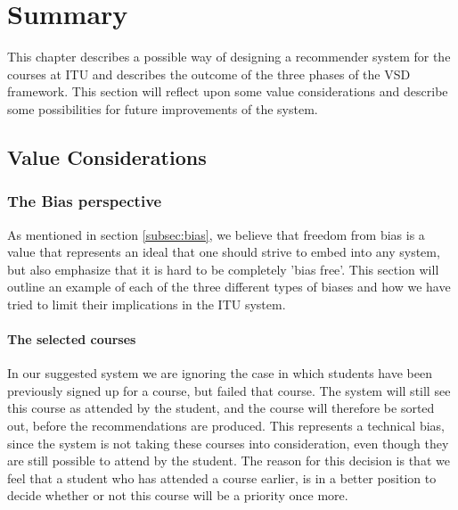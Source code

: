 
\section{Summary}
This chapter describes a possible way of designing a recommender system for the courses at ITU and describes the outcome of the three phases of the VSD framework.\newline
This section will reflect upon some value considerations and describe some possibilities for future improvements of the system. 

\subsection{Value Considerations} %
\label{sub:value_considerations}
\subsubsection{The Bias perspective}
\label{subsubsec:biasperspective}
As mentioned in section \ref{subsec:bias}, we believe that freedom from bias is a value that represents an ideal that one should strive to embed into any system, but also emphasize that it is hard to be completely 'bias free'. This section will outline an example of each of the three different types of biases and how we have tried to limit their implications in the ITU system.

\paragraph{The selected courses}
In our suggested system we are ignoring the case in which students have been previously signed up for a course, but failed that course. The system will still see this course as attended by the student, and the course will therefore be sorted out, before the recommendations are produced.\newline
This represents a technical bias, since the system is not taking these courses into consideration, even though they are still possible to attend by the student. The reason for this decision is that we feel that a student who has attended a course earlier, is in a better position to decide whether or not this course will be a priority once more.


